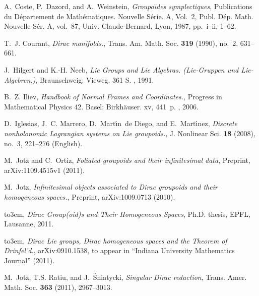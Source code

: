 \documentclass{amsart}
\theoremstyle{definition}
\begin{document}
 
\providecommand{\bysame}{\leavevmode\hbox to3em{\hrulefill}\thinspace}
\providecommand{\MR}{\relax\ifhmode\unskip\space\fi MR }
\providecommand{\MRhref}[2]{  \href{http://www.ams.org/mathscinet-getitem?mr=#1}{#2}
}
\providecommand{\href}[2]{#2}
\begin{thebibliography}{MMndDMn06}

A.~Coste, P.~Dazord, and A.~Weinstein, \emph{Groupo\"\i des symplectiques},
  Publications du {D}\'epartement de {M}ath\'ematiques. {N}ouvelle {S}\'erie.
  {A}, {V}ol.\ 2, Publ. D\'ep. Math. Nouvelle S\'er. A, vol.~87, Univ.
  Claude-Bernard, Lyon, 1987, pp.~i--ii, 1--62.

T.~J. Courant, \emph{{Dirac manifolds.}}, Trans. Am. Math. Soc. \textbf{319}
  (1990), no.~2, 631--661.

J.~Hilgert and K.-H. Neeb, \emph{{Lie {G}roups and {L}ie {A}lgebras.
  ({L}ie-{G}ruppen und {L}ie-{A}lgebren.)}}, {Braunschweig: Vieweg. 361 S. },
  1991.

B.~Z. Iliev, \emph{{Handbook of {N}ormal {F}rames and {C}oordinates.}},
  {Progress in Mathematical Physics 42. Basel: Birkh\"auser. xv, 441~p. },
  2006.

D.~Iglesias, J.~C. Marrero, D.~Mart{\'\i}n~de Diego, and E.~Mart{\'\i}nez,
  \emph{{Discrete nonholonomic Lagrangian systems on Lie groupoids.}}, J.
  Nonlinear Sci. \textbf{18} (2008), no.~3, 221--276 (English).

M.~Jotz and C.~Ortiz, \emph{Foliated groupoids and their infinitesimal data},
  Preprint, arXiv:1109.4515v1 (2011).

M.~Jotz, \emph{{Infinitesimal objects associated to {D}irac groupoids and their
  homogeneous spaces.}}, Preprint, arXiv:1009.0713 (2010).

\bysame, \emph{Dirac {G}roup(oid)s and {T}heir {H}omogeneous {S}paces}, Ph.D.
  thesis, EPFL, Lausanne, 2011.

\bysame, \emph{{Dirac Lie groups, {D}irac homogeneous spaces and the {T}heorem
  of {D}rinfel'd.}}, arXiv:0910.1538, to appear in ``Indiana University
  Mathematics Journal'' (2011).

M.~Jotz, T.S. Ratiu, and J.~{\'S}niatycki, \emph{Singular {D}irac reduction},
  Trans. Amer. Math. Soc. \textbf{363} (2011), 2967--3013.


\end{thebibliography}
\end{document}
